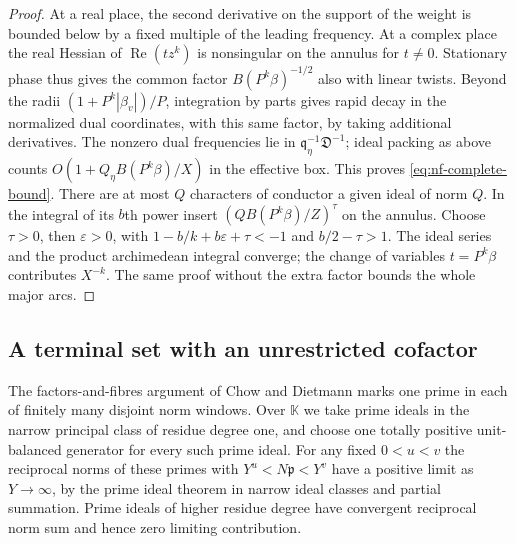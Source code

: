 \documentclass[11pt,letterpaper]{article}
\theoremstyle{definition}
\numberwithin{equation}{section}
\begin{document}
\begin{proof}
At a real place, the second derivative on the support of the weight
is bounded below by a fixed multiple of the leading frequency.
At a complex place the real Hessian of
$\operatorname{Re}(tz^k)$ is nonsingular on the annulus for $t\ne0$.
Stationary phase thus gives the common factor $B(P^k\beta)^{-1/2}$
also with linear twists. Beyond the radii
$(1+P^k|\beta_v|)/P$, integration by parts gives rapid decay in
the normalized dual coordinates, with this same factor, by taking
additional derivatives. The nonzero dual frequencies lie in
$\mathfrak q_\eta^{-1}\mathfrak D^{-1}$; ideal packing as above
counts $O(1+Q_\eta B(P^k\beta)/X)$ in the effective box.
This proves \eqref{eq:nf-complete-bound}. There are at most $Q$
characters of conductor a given ideal of norm $Q$. In the integral
of its $b$th power insert $(QB(P^k\beta)/Z)^\tau$ on the annulus.
Choose $\tau>0$, then $\varepsilon>0$, with
$1-b/k+b\varepsilon+\tau<-1$ and $b/2-\tau>1$.
The ideal series and the product archimedean integral converge;
the change of variables $t=P^k\beta$ contributes $X^{-k}$.
The same proof without the extra factor bounds the whole major arcs.
\end{proof}

\subsection{A terminal set with an unrestricted cofactor}
The factors-and-fibres argument of Chow and Dietmann
\cite[Sections~2--5]{NFChow} marks one prime in each of finitely
many disjoint norm windows. Over $\mathbb K$ we take prime ideals in
the narrow principal class of residue degree one, and choose one
totally positive unit-balanced generator for every such prime
ideal. For any fixed $0<u<v$ the reciprocal norms of these primes
with $Y^u<N\mathfrak p<Y^v$ have a positive limit as
$Y\to\infty$, by the prime ideal theorem in narrow ideal classes
and partial summation. Prime ideals of higher residue degree have
convergent reciprocal norm sum and hence zero limiting contribution.
\end{document}
